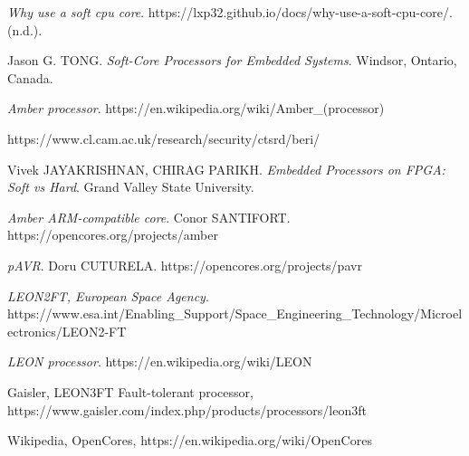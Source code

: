 \begin{thebibliography}{24}

	\textit{Why use a soft cpu core}. https://lxp32.github.io/docs/why-use-a-soft-cpu-core/. (n.d.).

	Jason G. \uppercase{Tong}. \textit{Soft-Core Processors for Embedded Systems}. Windsor, Ontario, Canada.
    
	\textit{Amber processor}. https://en.wikipedia.org/wiki/Amber\_(processor)

 https://www.cl.cam.ac.uk/research/security/ctsrd/beri/

 Vivek \uppercase{Jayakrishnan}, \uppercase{Chirag Parikh}. \textit{Embedded Processors on FPGA: Soft vs Hard}. Grand Valley State University.

 \textit{Amber ARM-compatible core}. Conor \uppercase{Santifort}. https://opencores.org/projects/amber

 \textit{pAVR}. Doru \uppercase{Cuturela}. https://opencores.org/projects/pavr

 \textit{LEON2FT, European Space Agency}. https://www.esa.int/Enabling\_Support/Space\_Engineering\_Technology/Microelectronics/LEON2-FT

 \textit{LEON processor}. https://en.wikipedia.org/wiki/LEON

 Gaisler, LEON3FT Fault-tolerant processor, https://www.gaisler.com/index.php/products/processors/leon3ft

 Wikipedia, OpenCores, https://en.wikipedia.org/wiki/OpenCores





\end{thebibliography}